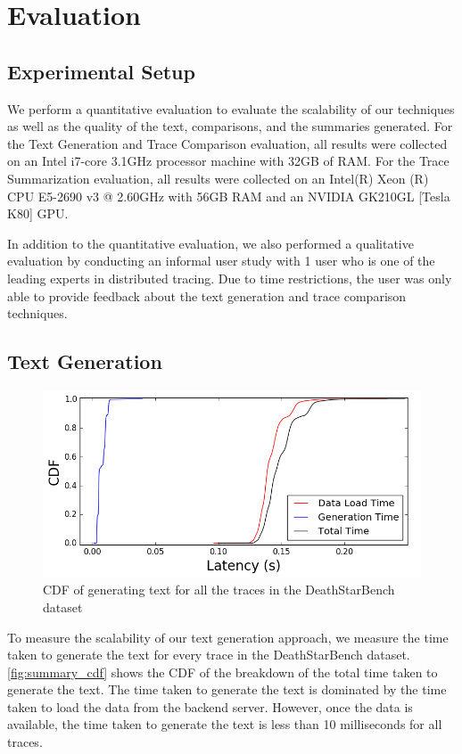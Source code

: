 \section{Evaluation}
\label{sec:evaluation}

\subsection{Experimental Setup}

We perform a quantitative evaluation to evaluate
the scalability of our techniques as well as the quality
of the text, comparisons, and the summaries generated.
For the Text Generation and Trace Comparison evaluation,
all results were collected on
an Intel i7-core 3.1GHz processor machine with 32GB of RAM.
For the Trace Summarization evaluation, all results were
collected on an Intel(R) Xeon (R) CPU E5-2690 v3 @ 2.60GHz
with 56GB RAM and an NVIDIA GK210GL [Tesla K80] GPU.

In addition to the quantitative evaluation, we also
performed a qualitative evaluation by conducting
an informal user study with 1 user who is one of the 
leading experts in distributed tracing. Due to time restrictions,
the user was only able to provide feedback about the text generation
and trace comparison techniques.

\subsection{Text Generation}

\begin{figure}[tbh]
    \centering
    \includegraphics[width=\linewidth]{"fig/summary_cdf"}
    \caption{CDF of generating text for all the traces in the DeathStarBench dataset}
    \label{fig:summary_cdf}
\end{figure}

To measure the scalability of our text generation approach, we measure the time taken
to generate the text for every trace in the DeathStarBench dataset. \autoref{fig:summary_cdf}
shows the CDF of the breakdown of the total time taken to generate the text. The time taken
to generate the text is dominated by the time taken to load the data from the backend server.
However, once the data is available, the time taken to generate the text is less than 10 milliseconds
for all traces.

